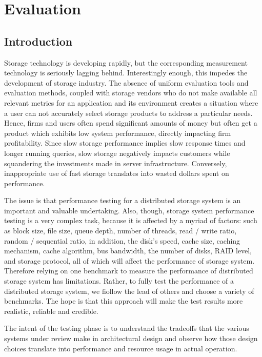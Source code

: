 \documentclass[11pt]{article}
\begin{document}
\section{Evaluation}
\subsection{Introduction}
Storage technology is developing rapidly, but the corresponding 
measurement technology is seriously lagging behind. Interestingly enough, 
this impedes the development of storage industry. The absence of uniform 
evaluation tools and evaluation methods, coupled with storage vendors who 
do not make available all relevant metrics for an application and its
environment creates a situation where a user can not accurately select 
storage products to address a particular needs. Hence, firms and users 
often spend significant amounts of money but often get a product which 
exhibits low system performance, directly impacting firm profitability. 
Since slow storage performance implies slow response times and longer 
running queries, slow storage negatively impacts customers while 
squandering the investments made in server infrastructure. Conversely, 
inappropriate use of fast storage translates into wasted dollars spent 
on performance.

The issue is that performance testing for a distributed storage system 
is an important and valuable undertaking. Also, though, storage system 
performance testing is a very complex task, because it is affected by 
a myriad of factors: such as block size, file size, queue depth, number 
of threads, read / write ratio, random / sequential ratio, in addition, 
the disk’s speed, cache size, caching mechanism, cache algorithm, bus 
bandwidth, the number of disks, RAID level, and storage protocol, all 
of which will affect the performance of storage system. Therefore 
relying on one benchmark to measure the performance of distributed 
storage system has limitations. Rather, to fully test the performance 
of a distributed storage system, we fiollow the lead of others and 
choose a variety of benchmarks. The hope is that this approach will 
make the test results more realistic, reliable and credible.

The intent of the testing phase is to understand the tradeoffs that 
the various systems under review make in architectural design and 
observe how those design choices translate into performance and 
resource usage in actual operation.
\end{document}
